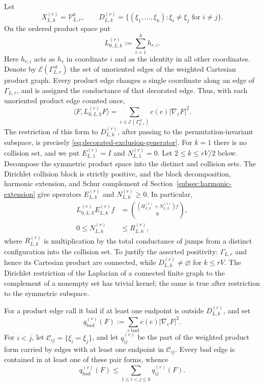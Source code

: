 \documentclass[11pt]{article}
\numberwithin{equation}{section}
\theoremstyle{remark}
\newcommand{\1}{\mathbf 1}
\begin{document}
Let
\[
 X_{L,k}^{(r)}=\mathcal V_{L,r}^k,
 \qquad
 D_{L,k}^{(r)}
 =\{(\xi_1,\ldots,\xi_k):\xi_i\ne\xi_j\text{ for }i\ne j\}.
\]
On the ordered product space put
\[
 L_{0,L,k}^{(r)}:=\sum_{i=1}^kh_{r,i}.
\]
Here \(h_{r,i}\) acts as \(h_r\) in coordinate \(i\) and as the identity
in all other coordinates.  Denote by
\(\mathcal E(\Gamma_{L,r}^{\square k})\) the set of unoriented edges of
the weighted Cartesian product graph.
Every product edge changes a single coordinate along an edge of
\(\Gamma_{L,r}\), and is assigned the conductance of that decorated edge.
Thus, with each unoriented product edge counted once,
\begin{equation}
 \langle F,L_{0,L,k}^{(r)}F\rangle
 =\sum_{e\in\mathcal E(\Gamma_{L,r}^{\square k})}
 c(e)|\nabla_eF|^2.
 \label{eq:decorated-product-form}
\end{equation}
The restriction of this form to \(D_{L,k}^{(r)}\), after passing to the
permutation-invariant subspace, is precisely
\eqref{eq:decorated-exclusion-generator}.  For \(k=1\) there is no
collision set, and we put \(E_{L,1}^{(r)}=I\) and
\(N_{L,1}^{(r)}=0\).  Let \(2\leq k\leq rV/2\) below.  Decompose the
symmetric product space into the distinct and collision sets.  The
Dirichlet collision block is strictly positive, and
the block decomposition, harmonic extension, and Schur complement of
Section~\ref{subsec:harmonic-extension} give operators
\(E_{L,k}^{(r)}\) and \(N_{L,k}^{(r)}\geq0\).  In particular,
\begin{align}
 L_{0,L,k}^{(r)}E_{L,k}^{(r)}f
 &=\binom{(H_{L,k}^{(r)}+N_{L,k}^{(r)})f}{0},
 \label{eq:decorated-L-on-extension}\\
 0\leq N_{L,k}^{(r)}&\leq R_{L,k}^{(r)},
 \label{eq:decorated-N-below-R}
\end{align}
where \(R_{L,k}^{(r)}\) is multiplication by the total conductance of
jumps from a distinct configuration into the collision set.
To justify the asserted positivity: \(\Gamma_{L,r}\) and hence its
Cartesian product are connected, while \(D_{L,k}^{(r)}\ne\varnothing\)
for \(k\leq rV\).  The Dirichlet restriction of the Laplacian of a
connected finite graph to the complement of a nonempty set has trivial
kernel; the same is true after restriction to the symmetric subspace.

For a product edge call it bad if at least one endpoint is outside
\(D_{L,k}^{(r)}\), and set
\begin{equation}
 q_{\mathrm{bad}}^{(r)}(F)
 :=\sum_{e\ \mathrm{bad}}c(e)|\nabla_eF|^2.
 \label{eq:decorated-bad-edge-form}
\end{equation}
For \(i<j\), let \(\mathcal C_{ij}=\{\xi_i=\xi_j\}\), and let
\(q_{ij}^{(r)}\) be the part of the weighted product form carried by edges
with at least one endpoint in \(\mathcal C_{ij}\).  Every bad edge is
contained in at least one of these pair forms, whence
\begin{equation}
 q_{\mathrm{bad}}^{(r)}(F)
 \leq\sum_{1\leq i<j\leq k}q_{ij}^{(r)}(F).
 \label{eq:decorated-bad-pair-cover}
\end{equation}
\end{document}

